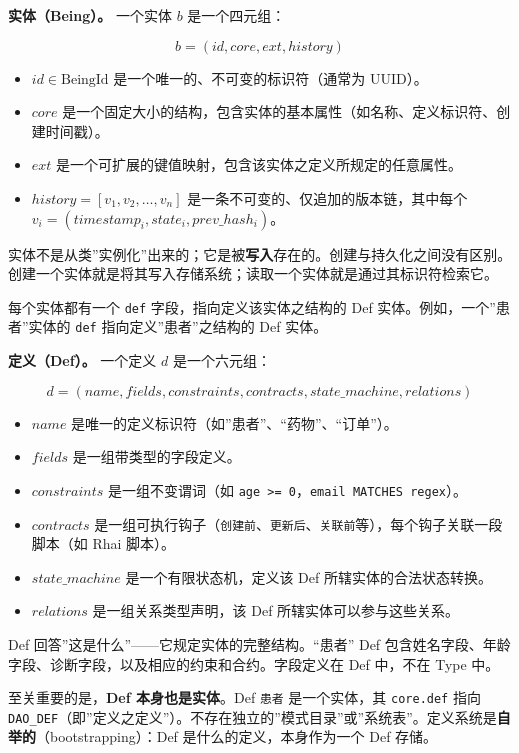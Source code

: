\documentclass[11pt,a4paper]{ctexart}
\begin{document}
\textbf{实体（Being）。} 一个实体 \(b\) 是一个四元组：

\[b = (id, core, ext, history)\]

\begin{itemize}
\tightlist
\item
  \(id \in \text{BeingId}\) 是一个唯一的、不可变的标识符（通常为
  UUID）。
\item
  \(core\)
  是一个固定大小的结构，包含实体的基本属性（如名称、定义标识符、创建时间戳）。
\item
  \(ext\) 是一个可扩展的键值映射，包含该实体之定义所规定的任意属性。
\item
  \(history = [v_1, v_2, \ldots, v_n]\)
  是一条不可变的、仅追加的版本链，其中每个
  \(v_i = (timestamp_i, state_i, prev\_hash_i)\)。
\end{itemize}

实体不是从类''实例化''出来的；它是被\textbf{写入}存在的。创建与持久化之间没有区别。创建一个实体就是将其写入存储系统；读取一个实体就是通过其标识符检索它。

每个实体都有一个 \texttt{def} 字段，指向定义该实体之结构的 Def
实体。例如，一个''患者''实体的 \texttt{def} 指向定义''患者''之结构的 Def
实体。

\textbf{定义（Def）。} 一个定义 \(d\) 是一个六元组：

\[d = (name, fields, constraints, contracts, state\_machine, relations)\]

\begin{itemize}
\tightlist
\item
  \(name\) 是唯一的定义标识符（如''患者''、``药物''、``订单''）。
\item
  \(fields\) 是一组带类型的字段定义。
\item
  \(constraints\) 是一组不变谓词（如
  \texttt{age\ \textgreater{}=\ 0}，\texttt{email\ MATCHES\ regex}）。
\item
  \(contracts\)
  是一组可执行钩子（\texttt{创建前}、\texttt{更新后}、\texttt{关联前}等），每个钩子关联一段脚本（如
  Rhai 脚本）。
\item
  \(state\_machine\) 是一个有限状态机，定义该 Def
  所辖实体的合法状态转换。
\item
  \(relations\) 是一组关系类型声明，该 Def 所辖实体可以参与这些关系。
\end{itemize}

Def 回答''这是什么''------它规定实体的完整结构。``患者'' Def
包含姓名字段、年龄字段、诊断字段，以及相应的约束和合约。字段定义在 Def
中，不在 Type 中。

至关重要的是，\textbf{Def 本身也是实体}。Def \texttt{患者}
是一个实体，其 \texttt{core.def} 指向
\texttt{DAO\_DEF}（即''定义之定义''）。不存在独立的''模式目录''或''系统表''。定义系统是\textbf{自举的}（bootstrapping）：Def
是什么的定义，本身作为一个 Def 存储。
\end{document}
